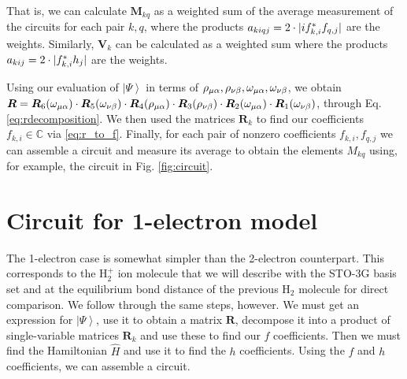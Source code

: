 \documentclass{aux/ttuthes2007}
\newcommand{\ket}[1]{\ensuremath{\left|#1\right\rangle}}
\newcommand{\ind}[1]{{\uo #1 \oo #1}}
\newcommand{\uo}[1]{
		\IfEqCase{#1}{
			{0}{\mu}
			{1}{\nu}
			{2}{\xi}
		}[\PackageError{uo}{Undefined option to uo: #1}{}]
}
\newcommand{\oo}[1]{
		\IfEqCase{#1}{
			{0}{\alpha}
			{1}{\beta}
			{2}{\gamma}
		}[\PackageError{unocorb}{Undefined option to unuo: #1}{}]
}
\DeclarePairedDelimiter\abs{\lvert}{\rvert}
\begin{document}
%
That is, we can calculate $\bm M_{kq}$ as a weighted sum of the average measurement of the circuits for each pair $k, q$, where the products $a_{kiqj} = 2\cdot \abs{if_{k, i}^*f_{q, j}}$ are the weights.
Similarly, $\bm V_k$ can be calculated as a weighted sum where the products $a_{kij} = 2\cdot \abs{f_{k, i}^*h_j}$ are the weights.

Using our evaluation of $\ket\Psi$ in terms of $\rho_\ind 0, \rho_\ind 1, \omega_\ind 0, \omega_\ind 1$, we obtain 
$\bm R = 
\bm R_6(\omega_\ind 0) \cdot
\bm R_5(\omega_\ind 1) \cdot
\bm R_4(\rho_\ind 0) \cdot
\bm R_3(\rho_\ind 1) \cdot
\bm R_2(\omega_\ind 0) \cdot
\bm R_1(\omega_\ind 1)
$, through Eq. \ref{eq:rdecomposition}.
%
We then used the matrices $\bm R_k$ to find our coefficients $f_{k, i} \in \mathbb{C}$ via \ref{eq:r_to_f}. Finally, for each pair of nonzero coefficients $f_{k, i}, f_{q, j}$ we can assemble a circuit and measure its average to obtain the elements $M_{kq}$ using, for example, the circuit in Fig. \ref{fig:circuit}.


\section {\textbf{Circuit for 1-electron model}}

The 1-electron case is somewhat simpler than the 2-electron counterpart.
This corresponds to the $\text{H}_2^+$ ion molecule that we will describe with the STO-3G basis set and at the equilibrium bond distance of the previous $\text{H}_2$ molecule for direct comparison.
We follow through the same steps, however. We must get an expression for $\ket \Psi$, use it to obtain a matrix $\bm R$, decompose it into a product of single-variable matrices $\bm R_k$ and use these to find our $f$ coefficients. Then we must find the Hamiltonian $\hat H$ and use it to find the $h$ coefficients. Using the $f$ and $h$ coefficients, we can assemble a circuit.
%
\end{document}
